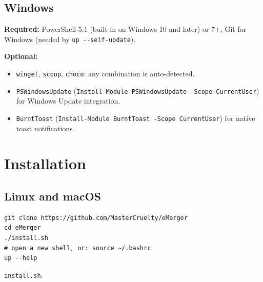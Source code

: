\documentclass[11pt,a4paper]{article}
\begin{document}
\subsection{Windows}
\textbf{Required:} PowerShell 5.1 (built-in on Windows 10 and later) or 7+,
Git for Windows (needed by \texttt{up -{}-self-update}).

\textbf{Optional:}
\begin{itemize}
  \item \texttt{winget}, \texttt{scoop}, \texttt{choco}: any combination
        is auto-detected.
  \item \texttt{PSWindowsUpdate}
        (\texttt{Install-Module PSWindowsUpdate -Scope CurrentUser}) for
        Windows Update integration.
  \item \texttt{BurntToast}
        (\texttt{Install-Module BurntToast -Scope CurrentUser}) for
        native toast notifications.
\end{itemize}

\section{Installation}\label{sec:install}

\subsection{Linux and macOS}

\begin{lstlisting}[language=bashplus]
git clone https://github.com/MasterCruelty/eMerger
cd eMerger
./install.sh
# open a new shell, or: source ~/.bashrc
up --help
\end{lstlisting}

\texttt{install.sh}:
\end{document}

